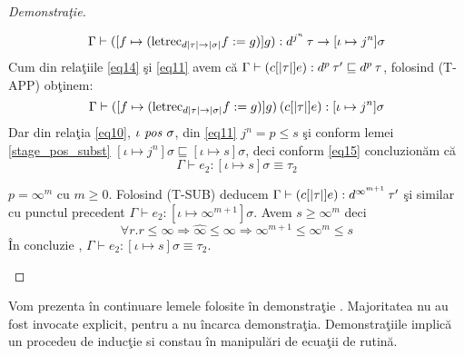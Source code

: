 \begin{proof}[Demonstra\c tie]
\begin{description}
\begin{enumerate*}
\begin{enumerate*}
                \begin{equation}
                    \Gamma \vdash ([f \mapsto (\text{letrec}_{d|\tau| \to |\sigma|}f := g)]g) : d^{j^n} \hspace{2pt} \tau \to [\iota \mapsto j^n] \sigma
                \end{equation}
                Cum din rela\c tiile \eqref{eq14} \c si \eqref{eq11} avem c\u a $\Gamma \vdash (c [|\tau|] e) : d^p\hspace{2pt} \tau' \sqsubseteq d^p\hspace{2pt} \tau$, folosind {\scriptsize (T-APP)} ob\c tinem:
                \begin{equation} \label{eq15}
                    \Gamma \vdash([f \mapsto (\text{letrec}_{d|\tau| \to |\sigma|}f := g)]g) \hspace{2pt} (c [|\tau|] e) : [\iota \mapsto j^n] \sigma
                \end{equation}
                Dar din rela\c tia \eqref{eq10}, $\iota \text{ \emph{pos} } \sigma$, din \eqref{eq11} $j^n = p \le s$ \c si conform lemei \ref{stage_pos_subst} $[\iota \mapsto j^n] \sigma \sqsubseteq [\iota \mapsto s] \sigma$, deci conform \eqref{eq15} concluzion\u am c\u a
                \begin{equation}
                    \Gamma \vdash e_2 : [\iota \mapsto s] \sigma \equiv \tau_2
                \end{equation}
                \item $p = \infty^m $ cu $m \ge 0$. Folosind {\scriptsize (T-SUB)} deducem $\Gamma \vdash (c [|\tau|] e) : d^{\infty^{m+1}}\hspace{2pt} \tau'$ \c si similar cu punctul precedent $\Gamma \vdash e_2 : [\iota \mapsto \infty^{m+1}]\sigma$. Avem $s \ge \infty^{m}$ deci
                \begin{equation}
                    \forall r.r \le \infty \Rightarrow \hat{\infty} \le \infty \Rightarrow \infty^{m+1} \le \infty^{m} \le s
                \end{equation}
                \^ In concluzie , $\Gamma \vdash e_2 : [\iota \mapsto s]\sigma\equiv \tau_2$. \qedhere
            \end{enumerate*}
        \end{enumerate*}
\end{description}
\end{proof}

\done{}
Vom prezenta \^ in continuare lemele folosite \^ in demonstra\c tie \citep{967408}. Majoritatea nu au fost invocate explicit, pentru a nu \^ incarca demonstra\c tia. Demonstra\c tiile implic\u a un procedeu de induc\c tie si constau \^ in manipul\u ari de ecua\c tii de rutin\u a.

